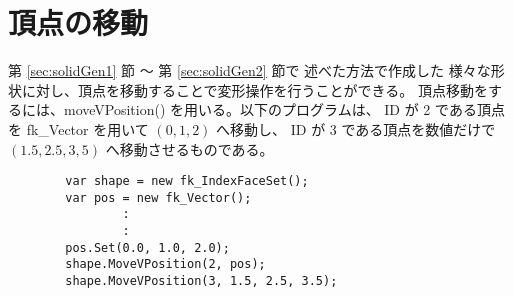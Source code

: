 \section{頂点の移動} \label{sec:movevertex}
第 \ref{sec:solidGen1} 節 〜 第 \ref{sec:solidGen2} 節で
述べた方法で作成した
様々な形状に対し、頂点を移動することで変形操作を行うことができる。
頂点移動をするには、moveVPosition() を用いる。以下のプログラムは、
ID が 2 である頂点を fk\_Vector を用いて \((0, 1, 2)\) へ移動し、
ID が 3 である頂点を数値だけで \((1.5, 2.5, 3,5)\) へ移動させるものである。
\\
\begin{breakbox}
\begin{verbatim}
        var shape = new fk_IndexFaceSet();
        var pos = new fk_Vector();
                :
                :
        pos.Set(0.0, 1.0, 2.0);
        shape.MoveVPosition(2, pos);
        shape.MoveVPosition(3, 1.5, 2.5, 3.5);
\end{verbatim}
\end{breakbox}

